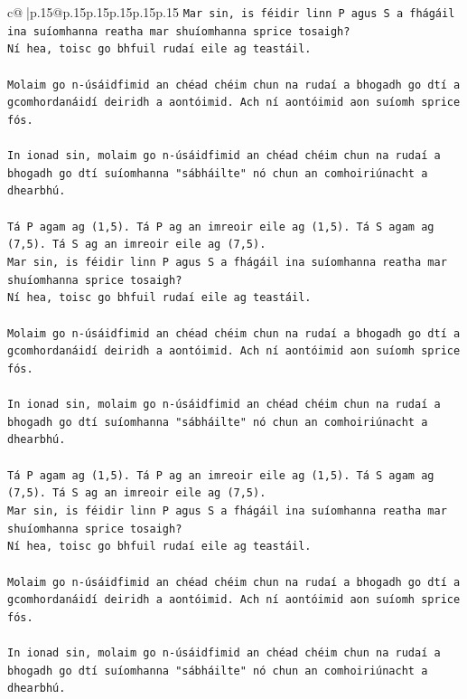 \documentclass{article}
\begin{document}
{\begin{supertabular}{c@{$\;$}|p{.15\linewidth}@{}p{.15\linewidth}p{.15\linewidth}p{.15\linewidth}p{.15\linewidth}p{.15\linewidth}}
{{{\texttt{Mar sin, is féidir linn P agus S a fhágáil ina suíomhanna reatha mar shuíomhanna sprice tosaigh?} \\
\texttt{Ní hea, toisc go bhfuil rudaí eile ag teastáil.} \\
\\ 
\texttt{Molaim go n{-}úsáidfimid an chéad chéim chun na rudaí a bhogadh go dtí a gcomhordanáidí deiridh a aontóimid. Ach ní aontóimid aon suíomh sprice fós.} \\
\\ 
\texttt{In ionad sin, molaim go n{-}úsáidfimid an chéad chéim chun na rudaí a bhogadh go dtí suíomhanna "sábháilte" nó chun an comhoiriúnacht a dhearbhú.} \\
\\ 
\texttt{Tá P agam ag (1,5). Tá P ag an imreoir eile ag (1,5). Tá S agam ag (7,5). Tá S ag an imreoir eile ag (7,5).} \\
\texttt{Mar sin, is féidir linn P agus S a fhágáil ina suíomhanna reatha mar shuíomhanna sprice tosaigh?} \\
\texttt{Ní hea, toisc go bhfuil rudaí eile ag teastáil.} \\
\\ 
\texttt{Molaim go n{-}úsáidfimid an chéad chéim chun na rudaí a bhogadh go dtí a gcomhordanáidí deiridh a aontóimid. Ach ní aontóimid aon suíomh sprice fós.} \\
\\ 
\texttt{In ionad sin, molaim go n{-}úsáidfimid an chéad chéim chun na rudaí a bhogadh go dtí suíomhanna "sábháilte" nó chun an comhoiriúnacht a dhearbhú.} \\
\\ 
\texttt{Tá P agam ag (1,5). Tá P ag an imreoir eile ag (1,5). Tá S agam ag (7,5). Tá S ag an imreoir eile ag (7,5).} \\
\texttt{Mar sin, is féidir linn P agus S a fhágáil ina suíomhanna reatha mar shuíomhanna sprice tosaigh?} \\
\texttt{Ní hea, toisc go bhfuil rudaí eile ag teastáil.} \\
\\ 
\texttt{Molaim go n{-}úsáidfimid an chéad chéim chun na rudaí a bhogadh go dtí a gcomhordanáidí deiridh a aontóimid. Ach ní aontóimid aon suíomh sprice fós.} \\
\\ 
\texttt{In ionad sin, molaim go n{-}úsáidfimid an chéad chéim chun na rudaí a bhogadh go dtí suíomhanna "sábháilte" nó chun an comhoiriúnacht a dhearbhú.} \\
}}}
\end{supertabular}}
\end{document}

